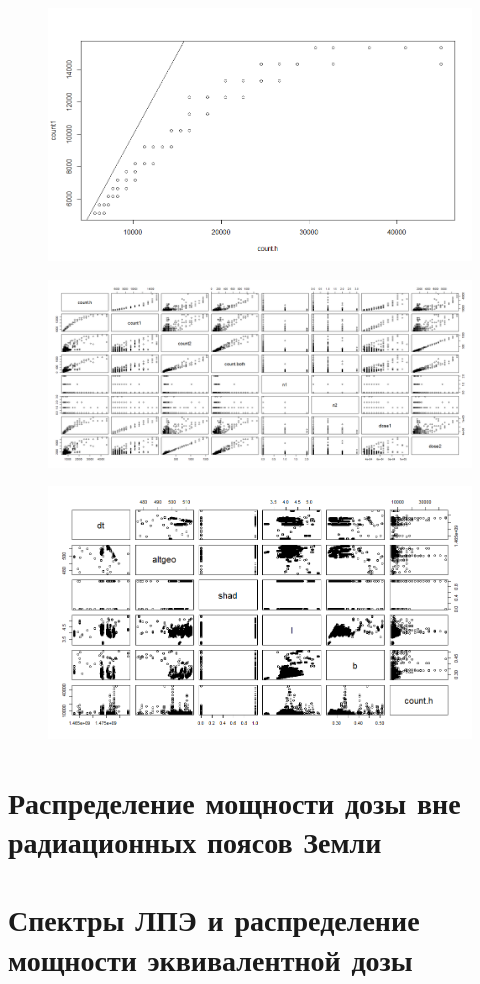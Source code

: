 \begin{figure}
	\centering
	\includegraphics[width=0.7\linewidth]{images/Flash/Rplot04}
	\caption{}
	\label{fig:rplot04}
\end{figure}



\begin{figure}
	\centering
	\includegraphics[width=0.7\linewidth]{images/Flash/Rplot06}
	\caption{}
	\label{fig:rplot06}
\end{figure}

\begin{figure}
	\centering
	\includegraphics[width=0.7\linewidth]{images/Flash/Rplot08}
	\caption{}
	\label{fig:rplot08}
\end{figure}

\section{Распределение мощности дозы вне радиационных поясов Земли}

\section{Спектры ЛПЭ и распределение мощности эквивалентной дозы}
